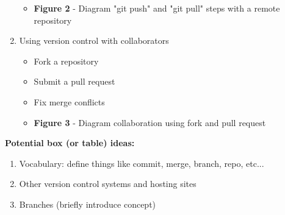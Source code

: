 \begin{enumerate}
\begin{itemize}
    \item \textbf{Figure 2} - Diagram "git push" and "git pull" steps with a remote repository
  \end{itemize}
  \item Using version control with collaborators
    \begin{itemize}
      \item Fork a repository
      \item Submit a pull request
      \item Fix merge conflicts
      \item \textbf{Figure 3} - Diagram collaboration using fork and pull request
  \end{itemize}
\end{enumerate}



\textbf{Potential box (or table) ideas:}
\begin{enumerate}
  \item Vocabulary: define things like commit, merge, branch, repo, etc...
  \item Other version control systems and hosting sites
  \item Branches (briefly introduce concept)
\end{enumerate}